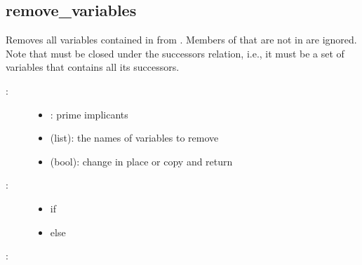 \documentclass[letterpaper,10pt,english]{sphinxmanual}
\begin{document}
\subsection{remove\_variables}
\label{\detokenize{PrimeImplicants:remove-variables}}\label{\detokenize{PrimeImplicants:id11}}

\begin{fulllineitems}
\label{\detokenize{PrimeImplicants:PyBoolNet.PrimeImplicants.remove_variables}}
Removes all variables contained in  from .
Members of  that are not in  are ignored.
Note that  must be closed under the successors relation, i.e.,
it must be a set of variables that contains all its successors.
\begin{description}
\item[{:}] \leavevmode\begin{itemize}
\item {} 
: prime implicants

\item {} 
 (list): the names of variables to remove

\item {} 
 (bool): change  in place or copy and return

\end{itemize}

\item[{:}] \leavevmode\begin{itemize}
\item {} 
 if 

\item {} 
 else

\end{itemize}

\end{description}

:

\begin{sphinxVerbatim}[commandchars=\\\{\}]
  \PYG{p}{[}\PYG{p}{]}
 
\end{sphinxVerbatim}

\end{fulllineitems}
\end{document}
